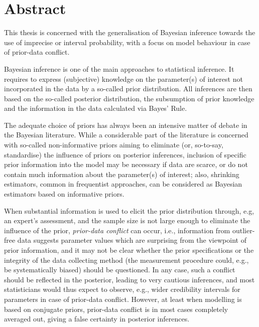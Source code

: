 \chapter*{Abstract}

This thesis is concerned with the generalisation of Bayesian inference towards the use of imprecise or interval probability,
with a focus on model behaviour in case of prior-data conflict.

Bayesian inference is one of the main approaches to statistical inference.
It requires to express (subjective) knowledge on the parameter(s) of interest not incorporated in the data by a so-called prior distribution.
All inferences are then based on the so-called posterior distribution,
the subsumption of prior knowledge and the information in the data calculated via Bayes' Rule.

The adequate choice of priors has always been an intensive matter of debate in the Bayesian literature.
While a considerable part of the literature is concerned with so-called non-informative priors
aiming to eliminate (or, so-to-say, standardise) the influence of priors on posterior inferences,
inclusion of specific prior information into the model may be necessary if data are scarce,
or do not contain much information about the parameter(s) of interest;
also, shrinking estimators, common in frequentist approaches, can be considered as Bayesian estimators based on informative priors.

When substantial information is used to elicit the prior distribution through, e.g, an expert's assessment,
and the sample size is not large enough to eliminate the influence of the prior, \emph{prior-data conflict} can occur,
i.e., information from outlier-free data suggests parameter values which are surprising from the viewpoint of prior information,
and it may not be clear whether the prior specifications or the integrity of the data collecting method
(the measurement procedure could, e.g., be systematically biased) should be questioned.
In any case, such a conflict should be reflected in the posterior, leading to very cautious inferences,
and most statisticians would thus expect to observe, e.g., wider credibility intervals for parameters in case of prior-data conflict.
However, at least when modelling is based on conjugate priors, prior-data conflict is in most cases completely averaged out,
giving a false certainty in posterior inferences.

%
%
%

